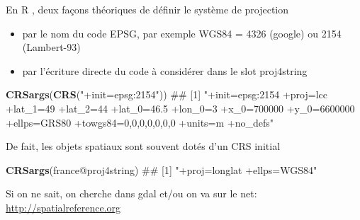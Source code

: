 \documentclass[8pt,ignorenonframetext,]{beamer}
\newenvironment{Shaded}{\begin{snugshade}}{\end{snugshade}}
\newcommand{\KeywordTok}[1]{\textcolor[rgb]{0.13,0.29,0.53}{\textbf{{#1}}}}
\newcommand{\DecValTok}[1]{\textcolor[rgb]{0.00,0.00,0.81}{{#1}}}
\newcommand{\StringTok}[1]{\textcolor[rgb]{0.31,0.60,0.02}{{#1}}}
\newcommand{\NormalTok}[1]{{#1}}
\begin{document}
\begin{frame}[fragile]{En R , deux façons théoriques de définir le
système de projection}

\begin{itemize}
\item
  par le nom du code EPSG, par exemple WGS84 = 4326 (google) ou 2154
  (Lambert-93)
\item
  par l'écriture directe du code à considérer dans le slot proj4string
\end{itemize}

\begin{Shaded}
\begin{Highlighting}[]
\KeywordTok{CRSargs}\NormalTok{(}\KeywordTok{CRS}\NormalTok{(}\StringTok{"+init=epsg:2154"}\NormalTok{))}
\NormalTok{## [1] "+init=epsg:2154 +proj=lcc +lat_1=49 +lat_2=44 +lat_0=46.5 +lon_0=3 +x_0=700000 +y_0=6600000 +ellps=GRS80 +towgs84=0,0,0,0,0,0,0 +units=m +no_defs"}
\end{Highlighting}
\end{Shaded}

De fait, les objets spatiaux sont souvent dotés d'un CRS initial

\begin{Shaded}
\begin{Highlighting}[]
\KeywordTok{CRSargs}\NormalTok{(france@proj4string)}
\NormalTok{## [1] "+proj=longlat +ellps=WGS84"}
\end{Highlighting}
\end{Shaded}

Si on ne sait, on cherche dans gdal et/ou on va sur le net:
\url{http://spatialreference.org}

\begin{Shaded}
\end{Shaded}

\end{frame}
\end{document}
